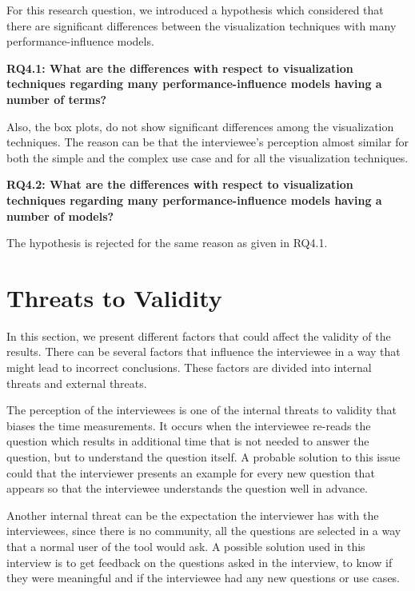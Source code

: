 For this research question, we introduced a hypothesis which considered that there are significant differences between the visualization techniques with many performance-influence models.

\begin{mdframed}
\textbf{RQ4.1: What are the differences with respect to visualization techniques regarding many performance-influence models having a number of terms?}
\end{mdframed}

Also, the box plots, do not show significant differences among the visualization techniques. The reason can be that the interviewee's perception almost similar for both the simple and the complex use case and for all the visualization techniques.

\begin{mdframed}
\textbf{RQ4.2: What are the differences with respect to visualization techniques regarding many performance-influence models having a number of models?}
\end{mdframed}

The hypothesis is rejected for the same reason as given in RQ4.1.

\section{Threats to Validity}
\label{sec:4.6}
In this section, we present different factors that could affect the validity of the results. There can be several factors that influence the interviewee in a way that might lead to incorrect conclusions. These factors are divided into internal threats and external threats.

The perception of the interviewees is one of the internal threats to validity that biases the time measurements. It occurs when the interviewee re-reads the question which results in additional time that is not needed to answer the question, but to understand the question itself. A probable solution to this issue could that the interviewer presents an example for every new question that appears so that the interviewee understands the question well in advance. 

Another internal threat can be the expectation the interviewer has with the interviewees, since there is no community, all the questions are selected in a way that a normal user of the tool would ask. A possible solution used in this interview is to get feedback on the questions asked in the interview, to know if they were meaningful and if the interviewee had any new questions or use cases.

